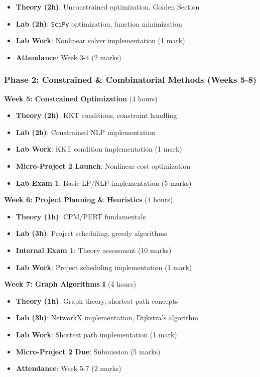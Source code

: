 \documentclass[
  letterpaper,
  DIV=11,
  numbers=noendperiod]{scrreprt}
\providecommand{\tightlist}{%
  \setlength{\itemsep}{0pt}\setlength{\parskip}{0pt}}
\begin{document}
\begin{itemize}
\tightlist
\item
  \textbf{Theory (2h)}: Unconstrained optimization, Golden Section
\item
  \textbf{Lab (2h)}: \texttt{SciPy} optimization, function minimization
\item
  \textbf{Lab Work}: Nonlinear solver implementation (1 mark)
\item
  \textbf{Attendance}: Week 3-4 (2 marks)
\end{itemize}

\subsubsection*{Phase 2: Constrained \& Combinatorial Methods (Weeks
5-8)}\label{phase-2-constrained-combinatorial-methods-weeks-5-8}

\textbf{Week 5: Constrained Optimization} (4 hours)

\begin{itemize}
\tightlist
\item
  \textbf{Theory (2h)}: KKT conditions, constraint handling
\item
  \textbf{Lab (2h)}: Constrained NLP implementation
\item
  \textbf{Lab Work}: KKT condition implementation (1 mark)
\item
  \textbf{Micro-Project 2 Launch}: Nonlinear cost optimization
\item
  \textbf{Lab Exam 1}: Basic LP/NLP implementation (5 marks)
\end{itemize}

\textbf{Week 6: Project Planning \& Heuristics} (4 hours)

\begin{itemize}
\tightlist
\item
  \textbf{Theory (1h)}: CPM/PERT fundamentals
\item
  \textbf{Lab (3h)}: Project scheduling, greedy algorithms
\item
  \textbf{Internal Exam 1}: Theory assessment (10 marks)
\item
  \textbf{Lab Work}: Project scheduling implementation (1 mark)
\end{itemize}

\textbf{Week 7: Graph Algorithms I} (4 hours)

\begin{itemize}
\tightlist
\item
  \textbf{Theory (1h)}: Graph theory, shortest path concepts
\item
  \textbf{Lab (3h)}: NetworkX implementation, Dijkstra's algorithm
\item
  \textbf{Lab Work}: Shortest path implementation (1 mark)
\item
  \textbf{Micro-Project 2 Due}: Submission (5 marks)
\item
  \textbf{Attendance}: Week 5-7 (2 marks)
\end{itemize}
\end{document}
